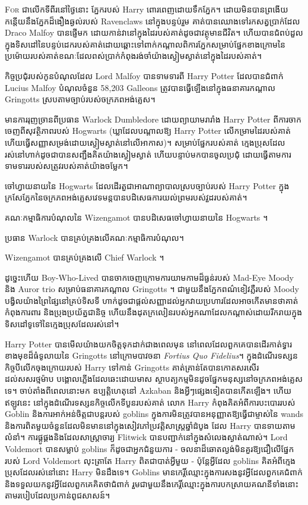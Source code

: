 
\lettrine{F}{or} ជាលើកទីពីរនៅថ្ងៃនោះ ភ្នែករបស់ Harry ពោរពេញដោយទឹកភ្នែក។ ដោយមិនបានព្រងើយកន្តើយនឹងភ្នែកដ៏ងឿងឆ្ងល់របស់ Ravenclaws នៅក្នុងបន្ទប់រួម គាត់បានឈោងទៅរកសត្វប្រាក់ដែល Draco Malfoy បានផ្ញើមក ដោយកាន់វានៅក្នុងដៃរបស់គាត់ដូចជាវត្ថុមានជីវិត។ ហើយបានជំពប់ដួលក្នុងទិសដៅនៃបន្ទប់ដេករបស់គាត់ដោយឆ្ពោះទៅពាក់កណ្តាលពិការភ្នែកសម្រាប់ផ្នែកខាងក្រោមនៃប្រម៉ោយរបស់គាត់ខណៈដែលពស់ប្រាក់កំពុងរង់ចាំយ៉ាងស្ងៀមស្ងាត់នៅក្នុងដៃរបស់គាត់។


កិច្ចប្រជុំរបស់កូនបំណុលដែល Lord Malfoy បានទាមទារពី Harry Potter ដែលបានជំពាក់ Lucius Malfoy បំណុលចំនួន 58,203 Galleons ត្រូវបានធ្វើឡើងនៅក្នុងធនាគារកណ្តាល Gringotts ស្របតាមច្បាប់របស់ចក្រភពអង់គ្លេស។

មានការរុញច្រានពីប្រធាន Warlock Dumbledore ដោយព្យាយាមរារាំង Harry Potter ពីការចាកចេញពីសុវត្ថិភាពរបស់ Hogwarts (ឃ្លាដែលបណ្តាលឱ្យ Harry Potter លើកម្រាមដៃរបស់គាត់ ហើយធ្វើសញ្ញាសម្រង់ដោយស្ងៀមស្ងាត់នៅលើអាកាស)។ សម្រាប់ផ្នែករបស់គាត់ ក្មេងប្រុសដែលរស់នៅហាក់ដូចជាបានសញ្ជឹងគិតយ៉ាងស្ងៀមស្ងាត់ ហើយបន្ទាប់មកបានចូលប្រជុំ ដោយធ្វើតាមការទាមទាររបស់សត្រូវរបស់គាត់យ៉ាងចម្លែក។

ចៅហ្វាយនាយនៃ Hogwarts ដែលដើរតួជាអាណាព្យាបាលស្របច្បាប់របស់ Harry Potter ក្នុងក្រសែភ្នែកនៃចក្រភពអង់គ្លេសវេទមន្តបានបដិសេធការយល់ព្រមរបស់វួដរបស់គាត់។

គណៈកម្មាធិការបំណុលនៃ Wizengamot បានបដិសេធចៅហ្វាយនាយនៃ Hogwarts ។

ប្រធាន Warlock បានគ្រប់គ្រងលើគណៈកម្មាធិការបំណុល។

Wizengamot បានគ្រប់គ្រងលើ Chief Warlock ។

ដូច្នេះហើយ Boy-Who-Lived បានចាកចេញក្រោមការយាមកាមដ៏ធ្ងន់របស់ Mad-Eye Moody និង Auror trio សម្រាប់ធនាគារកណ្តាល Gringotts ។ ជាមួយនឹងភ្នែកពណ៌ខៀវភ្លឺរបស់ Moody បង្វិលយ៉ាងព្រៃផ្សៃនៅគ្រប់ទិសទី ហាក់ដូចជាផ្តល់សញ្ញាដល់អ្នកវាយប្រហារដែលអាចកើតមានថាគាត់កំពុងការពារ និងប្រុងប្រយ័ត្នជានិច្ច ហើយនឹងដុតក្រលៀនរបស់អ្នកណាដែលកណ្តាស់ដោយរីករាយក្នុងទិសដៅទូទៅនៃក្មេងប្រុសដែលរស់នៅ។

Harry Potter បានមើលយ៉ាងយកចិត្តទុកដាក់ជាងពេលមុន នៅពេលដែលពួកគេបានដើរកាត់ទ្វារខាងមុខដ៏ធំទូលាយនៃ Gringotts នៅក្រោមបាវចនា \emph{Fortius Quo Fidelius}។ ក្នុងដំណើរទស្សនកិច្ចបីលើកចុងក្រោយរបស់ Harry ទៅកាន់ Gringotts គាត់គ្រាន់តែបានកោតសរសើរដល់សសរថ្មម៉ាប បង្គោលភ្លើងដែលឆេះដោយមាស ស្ថាបត្យកម្មមិនដូចផ្នែកមនុស្សនៅចក្រភពអង់គ្លេសទេ។ ចាប់តាំងពីពេលនោះមក ឧប្បត្តិហេតុនៅ Azkaban និងអ្វីៗផ្សេងទៀតបានកើតឡើង។ ហើយឥឡូវនេះ នៅក្នុងដំណើរទស្សនកិច្ចលើកទីបួនរបស់គាត់ លោក Harry កំពុងគិតអំពីការបះបោររបស់ Goblin និងការអាក់អន់ចិត្តជាបន្តរបស់ goblins ក្នុងការមិនត្រូវបានអនុញ្ញាតឱ្យធ្វើជាម្ចាស់នៃ wands និងការពិតមួយចំនួនដែលមិនមាននៅក្នុងសៀវភៅប្រវត្តិសាស្រ្តឆ្នាំដំបូង ដែល Harry បានទាយតាមលំនាំ។ ការផ្គូផ្គងនិងដែលសាស្រ្តាចារ្យ Flitwick បានបញ្ជាក់នៅក្នុងសំលេងស្ងាត់ណាស់។ Lord Voldemort បានសម្លាប់ goblins ក៏ដូចជាអ្នកជំនួយការ - ចលនាដ៏ឆោតល្ងង់មិនគួរឱ្យជឿលើផ្នែករបស់ Lord Voldemort លុះត្រាតែ Harry ពិតជាបាត់អ្វីមួយ - ប៉ុន្តែអ្វីដែល goblins គិតអំពីក្មេងប្រុសដែលរស់នៅនោះ Harry មិនដឹងទេ។ Goblins មានកេរ្តិ៍ឈ្មោះក្នុងការសងនូវអ្វីដែលពួកគេជំពាក់ និងទទួលយកនូវអ្វីដែលពួកគេគិតថាជំពាក់ រួមជាមួយនឹងកេរ្តិ៍ឈ្មោះក្នុងការបកស្រាយគណនីទាំងនោះតាមរបៀបដែលប្រកាន់ពូជសាសន៍។

